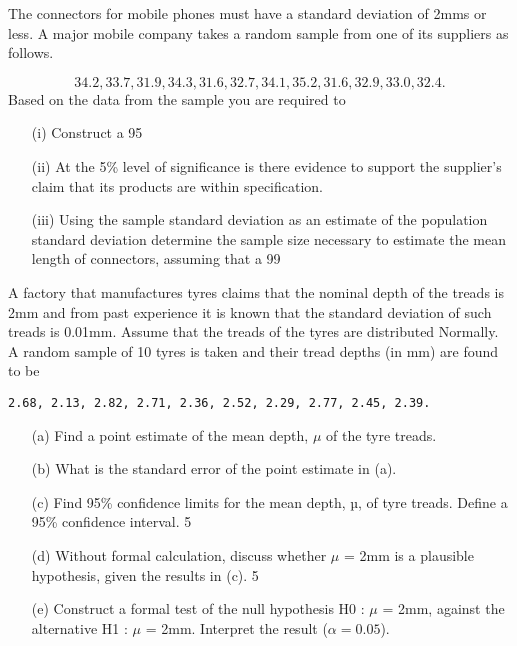 


 
The connectors for mobile phones must have a standard deviation of 2mms or less.  
A major mobile company takes a random sample from one of its suppliers as follows.

\[ 
34.2, 33.7, 31.9, 34.3, 31.6, 32.7, 34.1, 35.2, 31.6, 32.9, 33.0, 32.4.
\] 
Based on the data from the sample you are required to 
 

\begin{itemize} 
\item[(i)]   Construct a 95%
\item[(ii)]  At the 5\% level of significance is there evidence to support the supplier’s claim that its products are within specification.
\item[(iii)] Using the sample standard deviation as an estimate of the population standard deviation determine the sample size necessary to estimate the mean length of connectors, assuming that a 99%
\end{itemize}


A factory that manufactures tyres claims that the nominal depth of the treads is 2mm and from past experience it is known that the standard deviation of such treads is 0.01mm. Assume that the treads of the tyres are distributed Normally. A random sample of 10 tyres is taken and their tread depths (in mm) are found to be 

\begin{verbatim} 
2.68, 2.13, 2.82, 2.71, 2.36, 2.52, 2.29, 2.77, 2.45, 2.39.
\end{verbatim} 
\begin{itemize} 
\item[(a)] Find a point estimate of the mean depth, $\mu$ of the tyre treads. 	
 
\item[(b)] What is the standard error of the point estimate in (a). 			
 
\item[(c)] Find 95\% confidence limits for the mean depth, µ, of tyre treads. Define a 95\%  confidence interval. 						5
 
\item[(d)] Without formal calculation, discuss whether $\mu$ = 2mm is a plausible  hypothesis,   given the results in (c). 						5
 
\item[(e)] Construct a formal test of the null hypothesis 
H0 : $\mu$ = 2mm, against the alternative  H1 : $\mu$ = 2mm. Interpret the result ($\alpha = 0.05$).		 										
 
 \end{itemize}
 
 
 
 
